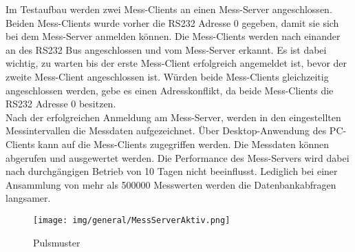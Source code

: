 Im Testaufbau werden zwei Mess-Clients an einen Mess-Server angeschlossen. Beiden Mess-Clients wurde vorher die RS232 Adresse 0 gegeben, damit sie sich bei dem Mess-Server anmelden können. Die Mess-Clients werden nach einander an des RS232 Bus angeschlossen und vom Mess-Server erkannt. Es ist dabei wichtig, zu warten bis der erste Mess-Client erfolgreich angemeldet ist, bevor der zweite Mess-Client angeschlossen ist. Würden beide Mess-Clients gleichzeitig angeschlossen werden, gebe es einen Adresskonflikt, da beide Mess-Clients die RS232 Adresse 0 besitzen.\\
Nach der erfolgreichen Anmeldung am Mess-Server, werden in den eingestellten Messintervallen die Messdaten aufgezeichnet. Über Desktop-Anwendung des PC-Clients kann auf die Mess-Clients zugegriffen werden. Die Messdaten können abgerufen und ausgewertet werden. Die Performance des Mess-Servers wird dabei nach durchgängigen Betrieb von 10 Tagen nicht beeinflusst. Lediglich bei einer Ansammlung von mehr als 500000 Messwerten werden die Datenbankabfragen langsamer.

\begin{figure}[H]
\begin{center}
\texttt{[image: img/general/MessServerAktiv.png]}
\caption{Pulsmuster}
\label{figure_Pulsepattern}
\end{center}
\end{figure}
